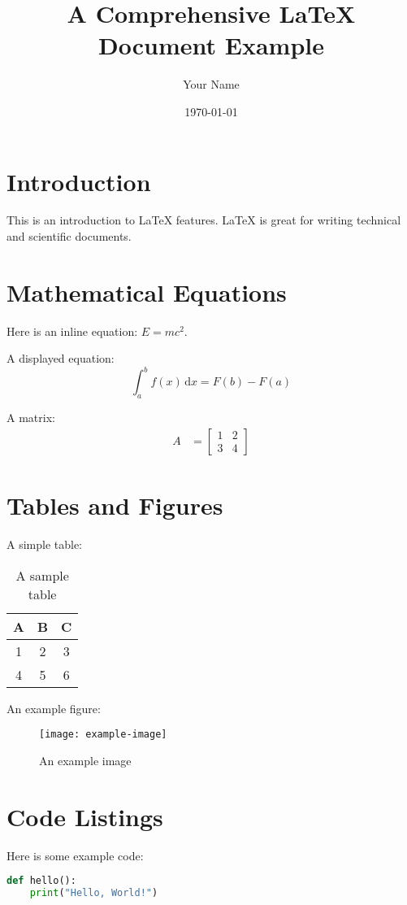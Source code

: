 \documentclass[a4paper,12pt]{article}
\newcommand{\dx}{\,\mathrm{d}x}
\begin{document}
\title{A Comprehensive \LaTeX{} Document Example}
\author{Your Name}
\date{\today}
\maketitle

\tableofcontents
\newpage

\section{Introduction}
This is an introduction to \LaTeX{} features. \LaTeX{} is great for writing technical and scientific documents.

\section{Mathematical Equations}
Here is an inline equation: \(E=mc^2\).

A displayed equation:
\begin{equation}
    \int_a^b f(x) \dx = F(b) - F(a)
\end{equation}

A matrix:
\begin{align}
    A &= \begin{bmatrix} 1 & 2 \\ 3 & 4 \end{bmatrix}
\end{align}

\section{Tables and Figures}
A simple table:
\begin{table}[h]
	\centering
	\begin{tabular}{|c|c|c|}
		\hline A & B & C \\ \hline 1 & 2 & 3 \\ 4 & 5 & 6 \\ \hline
	\end{tabular}
	\caption{A sample table}\label{tab:sample}
\end{table}

An example figure:
\begin{figure}[h]
	\centering
	\texttt{[image: example-image]}
	\caption{An example image}\label{fig:image}
\end{figure}

\section{Code Listings}
Here is some example code:
\begin{lstlisting}[language=Python, caption=Example Python Code]
def hello():
    print("Hello, World!")
\end{lstlisting}
\end{document}
